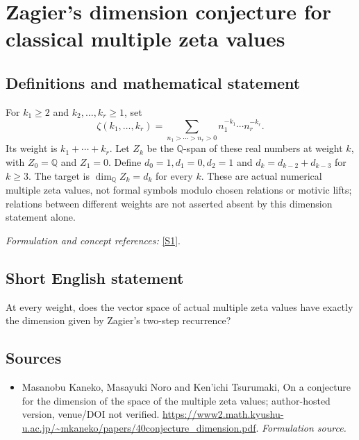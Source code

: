 \documentclass[11pt]{article}
\begin{document}
\section*{\texorpdfstring{Zagier's dimension conjecture for classical multiple zeta values}{Zagier's dimension conjecture for classical multiple zeta values}}\label{30006982}
\subsection{Definitions and mathematical statement}
For $k_1\ge2$ and $k_2,\ldots,k_r\ge1$, set
\[
 \zeta(k_1,\ldots,k_r)=\sum_{n_1>\cdots>n_r>0}
 n_1^{-k_1}\cdots n_r^{-k_r}.
\]
Its weight is $k_1+\cdots+k_r$. Let $Z_k$ be the ${\mathbb{Q}}$-span of these real numbers at weight $k$, with $Z_0={\mathbb{Q}}$ and $Z_1=0$. Define $d_0=1,d_1=0,d_2=1$ and
$d_k=d_{k-2}+d_{k-3}$ for $k\ge3$. The target is $\dim_{{\mathbb{Q}}}Z_k=d_k$ for every $k$. These are actual numerical multiple zeta values, not formal symbols modulo chosen relations or motivic lifts; relations between different weights are not asserted absent by this dimension statement alone.
\par\smallskip\textit{Formulation and concept references:} \href{https://www2.math.kyushu-u.ac.jp/~mkaneko/papers/40conjecture_dimension.pdf}{[S1]}.

\subsection{Short English statement}
At every weight, does the vector space of actual multiple zeta values have exactly the dimension given by Zagier's two-step recurrence?
\subsection{Sources}
\begin{itemize}
\item[S1]Masanobu Kaneko, Masayuki Noro and Ken'ichi Tsurumaki, On a conjecture for the dimension of the space of the multiple zeta values; author-hosted version, venue/DOI not verified.
\url{https://www2.math.kyushu-u.ac.jp/~mkaneko/papers/40conjecture_dimension.pdf}.
\textit{Formulation source.}
\end{itemize}
\end{document}
